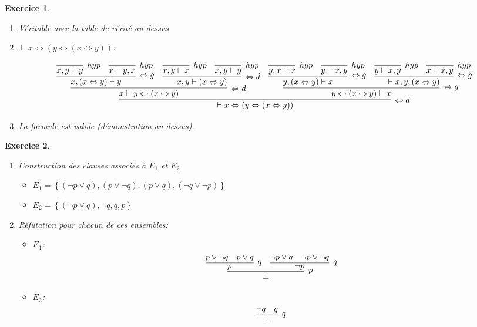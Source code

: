 \documentclass{article}
\theoremstyle{plain}
\newtheorem{exo}{Exercice}%
\begin{document}
\begin{exo}
\begin{enumerate}
\begin{enumerate}
\begin{itemize}
        \end{itemize}
    \item Véritable avec la table de vérité au dessus
    \item $\vdash x \Leftrightarrow (y \Leftrightarrow (x \Leftrightarrow y))$:

    \footnotesize
    \[
    \infer[\Leftrightarrow d]{\vdash x \Leftrightarrow (y \Leftrightarrow (x \Leftrightarrow y))}
    {
     \infer[\Leftrightarrow d]{x \vdash y \Leftrightarrow (x \Leftrightarrow y)}
     {\infer[\Leftrightarrow g]{x, (x \Leftrightarrow y) \vdash y}
      {
       \infer[hyp]{x, y \vdash y}{}
       &
       \infer[hyp]{x \vdash y, x}{}
      }
      &
      \infer[\Leftrightarrow d]{x, y \vdash (x \Leftrightarrow y)}
      {
       \infer[hyp]{x, y \vdash x}{}
       &
       \infer[hyp]{x, y \vdash y}{}
      }
     }
     &
     \infer[\Leftrightarrow g]{y \Leftrightarrow (x \Leftrightarrow y) \vdash x}
     {
      \infer[\Leftrightarrow g]{y, (x \Leftrightarrow y) \vdash x}
       {
        \infer[hyp]{y, x \vdash x}{}
        &
        \infer[hyp]{y \vdash x, y}{}
       }
      &
      \infer[\Leftrightarrow g]{\vdash x, y, (x \Leftrightarrow y) }
      {
        \infer[hyp]{y \vdash x, y}{}
        &
        \infer[hyp]{x \vdash x, y}{}
      }
     }
    }
    \] \normalsize

    \item La formule est valide (démonstration au dessus).
    \end{enumerate}
\end{enumerate}
\end{exo}

\begin{exo}
\begin{enumerate}
    \item  Construction des clauses associés à $E_1$ et $E_2$
    \begin{itemize}
        \item $E_1 = \left\{
                    (\neg p \vee q), (p \vee \neg q),
                    (p \vee q), (\neg q \vee \neg p)
                \right\} $
        \item $E_2 = \left\{
                    (\neg p \vee q), \neg q, q, p
                \right\} $
    \end{itemize}

    \item Réfutation pour chacun de ces ensembles:
    \begin{itemize}
        \item $E_1$:
        \[
            \infer[p]{\bot}{
            \infer[q]{p}{p \vee \neg q & p \vee q}
            &
            \infer[q]{\neg p}{\neg p \vee q & \neg p \vee \neg q}
            }
        \]

        \item $E_2$:
        \[
            \infer[q]{\bot}
            {\neg q & q}
        \]
    \end{itemize}
\end{enumerate}
\end{exo}
\end{document}

